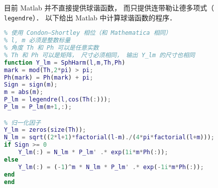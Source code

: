 
目前 Matlab 并不直接提供球谐函数， 而只提供连带勒让德多项式（ \lstinline|legendre|）． 以下给出 Matlab 中计算球谐函数的程序．

\begin{lstlisting}[language=matlab, caption=Ylm.m]
% 计算球谐函数 Y_{lm}
% 使用 Condon–Shortley 相位（和 Mathematica 相同）
% l, m 必须是整数标量
% 角度 Th 和 Ph 可以是任意实数
% Th 和 Ph 可以是矩阵， 尺寸必须相同， 输出 Y_lm 的尺寸也相同
function Y_lm = SphHarm(l,m,Th,Ph)
mark = mod(Th,2*pi) > pi;
Ph(mark) = Ph(mark) + pi;
Sign = sign(m);
m = abs(m);
P_lm = legendre(l,cos(Th(:)));
P_lm = P_lm(m+1,:);

% 归一化因子
Y_lm = zeros(size(Th));
N_lm = sqrt((2*l+1)*factorial(l-m)./(4*pi*factorial(l+m)));
if Sign >= 0
    Y_lm(:) = N_lm * P_lm' .* exp(1i*m*Ph(:));
else
    Y_lm(:) = (-1)^m * N_lm * P_lm' .* exp(-1i*m*Ph(:));
end
end
\end{lstlisting}

